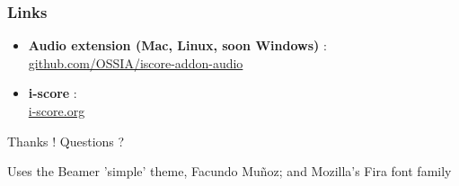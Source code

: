 \documentclass{beamer}
\begin{document}
\begin{frame}
    \frametitle{Links} 
    \Large
    \begin{itemize}
        \setlength\itemsep{1em}
        \item \textbf{Audio extension ({\unicodefun Mac, Linux, soon Windows})} :~\\
        \url{github.com/OSSIA/iscore-addon-audio} 
        \item \textbf{i-score} :~\\
         \url{i-score.org}
    \end{itemize}
        
    \centering
    \vspace{2em}
    \Large{Thanks ! Questions ?}
    \vspace{2em}
    
    \tiny{Uses the Beamer 'simple' theme, Facundo Muñoz; and Mozilla's Fira font family}
\end{frame}
\end{document}
